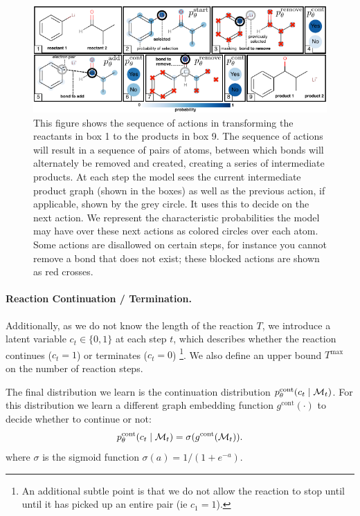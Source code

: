\begin{figure}
\centering
\includegraphics[width=\textwidth]{reaction_model_blue}
\caption{
 This figure shows the sequence of actions in transforming the reactants in box 1 to the products in box 9.
 The sequence of actions will result in a sequence of pairs of atoms, between which bonds will alternately be removed and created, creating a series of intermediate products. 
At each step the model sees the current intermediate product graph (shown in the boxes) as well as the previous action, if applicable, shown by the grey circle. It uses this to decide on the next action.
We represent the characteristic probabilities the model may have over these next actions as colored circles over each atom.
Some actions are disallowed on certain steps, for instance you cannot remove a bond that does not exist; these blocked actions are shown as red crosses.
}
\label{fig:reaction_model}
\end{figure}



\paragraph{Reaction Continuation / Termination.}
Additionally, as we do not know the length of the reaction $T$, we introduce a latent variable $c_t \in \{0, 1\}$ at each step $t$, which describes whether the reaction continues ($c_t\!=\!1$) or terminates ($c_t\!=\!0$) \footnote{An additional subtle point is that we do not allow the reaction to stop until until it has picked up an entire pair (ie $c_1=1$).}.
We also define an upper bound  $T^{\mathrm{max}}$ on the number of reaction steps. 

The final distribution we learn is the continuation distribution $p_\theta^\textrm{cont}(c_t \mid {\mathcal{M}}_{t})$.
For this distribution we learn a different graph embedding function $g^{\textrm{cont}}(\cdot)$ to decide whether to continue or not:
\begin{align}
p_\theta^\textrm{cont}(c_t \mid {\mathcal{M}}_t) = \sigma(g^{\textrm{cont}}({\mathcal{M}}_t)).
\end{align}
where $\sigma$ is the sigmoid function $\sigma(a) = 1/(1+e^{-a})$.


